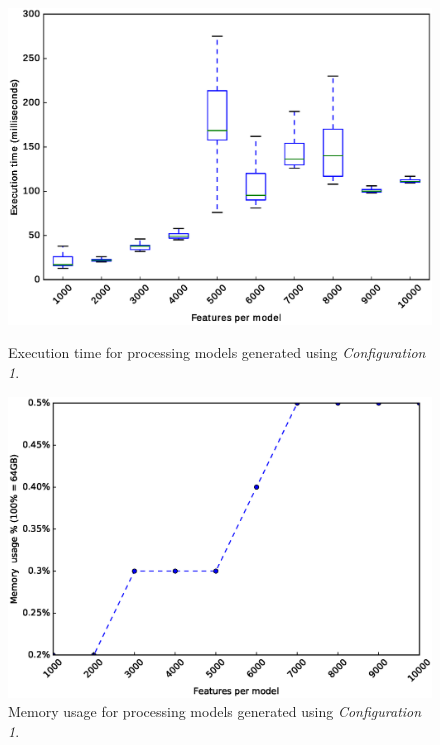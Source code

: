 \begin{figure}[h]
	\centering
	\begin{minipage}[b]{0.48\textwidth}
		\includegraphics[width=\textwidth]{boxplot_0_1.eps}
		\caption{Execution time for processing models generated using \textit{Configuration 1}.}\label{fig:plot:probs:boxplot_0_1}
	\end{minipage}
	\hfill
	\begin{minipage}[b]{0.48\textwidth}
		\includegraphics[width=\textwidth]{boxplot_0_1_mem.eps}
		\caption{Memory usage for processing models generated using \textit{Configuration 1}.}\label{fig:plot:probs:boxplot_0_1_mem}
	\end{minipage}
\end{figure}

